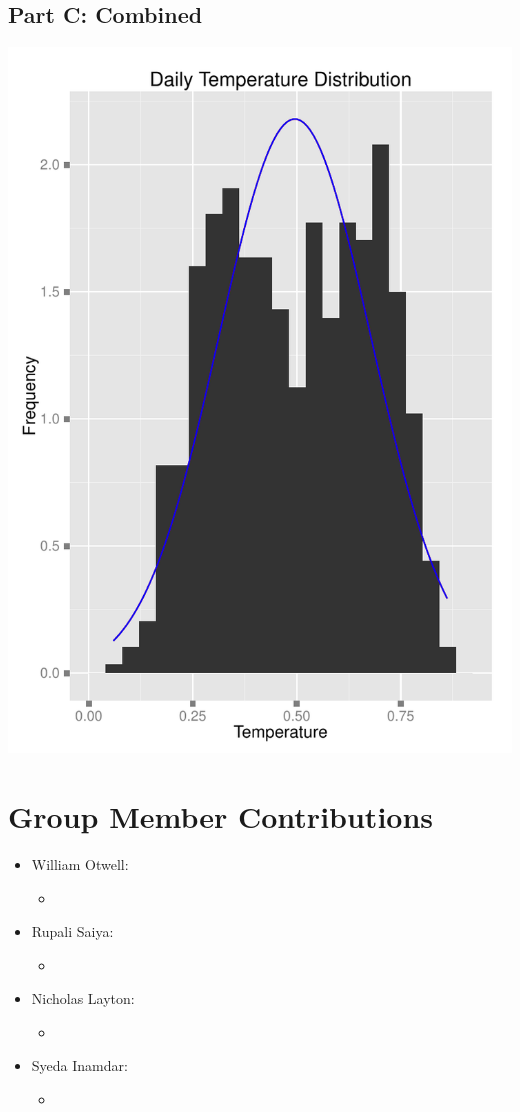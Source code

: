 \documentclass[11pt]{article}
\begin{document}
\subsection{Part C: Combined}
\label{subsesc:problem3ccombined}
\includegraphics{Problem3C.pdf}
\newline
\pagebreak

\section{Group Member Contributions}
\begin{itemize}
	\item William Otwell:
	\begin{itemize}
		\item 
	\end{itemize}
	
	\item Rupali Saiya:
	\begin{itemize}
	\item
	\end{itemize}
	
	\item Nicholas Layton:
	\begin{itemize}
		\item 
	\end{itemize}
	
	\item Syeda Inamdar:
	\begin{itemize}
		\item 
	\end{itemize}
\end{itemize}
\pagebreak
\end{document}
